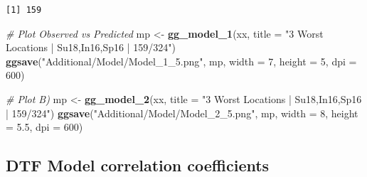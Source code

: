 \documentclass[
]{article}
\newenvironment{Shaded}{\begin{snugshade}}{\end{snugshade}}
\newcommand{\CommentTok}[1]{\textcolor[rgb]{0.56,0.35,0.01}{\textit{#1}}}
\newcommand{\DataTypeTok}[1]{\textcolor[rgb]{0.13,0.29,0.53}{#1}}
\newcommand{\DecValTok}[1]{\textcolor[rgb]{0.00,0.00,0.81}{#1}}
\newcommand{\FloatTok}[1]{\textcolor[rgb]{0.00,0.00,0.81}{#1}}
\newcommand{\KeywordTok}[1]{\textcolor[rgb]{0.13,0.29,0.53}{\textbf{#1}}}
\newcommand{\NormalTok}[1]{#1}
\newcommand{\OperatorTok}[1]{\textcolor[rgb]{0.81,0.36,0.00}{\textbf{#1}}}
\newcommand{\StringTok}[1]{\textcolor[rgb]{0.31,0.60,0.02}{#1}}
\begin{document}
\begin{Shaded}
\end{Shaded}

\begin{verbatim}
[1] 159
\end{verbatim}

\begin{Shaded}
\begin{Highlighting}[]
\CommentTok{# Plot Observed vs Predicted}
\NormalTok{mp <-}\StringTok{ }\KeywordTok{gg_model_1}\NormalTok{(xx, }\DataTypeTok{title =} \StringTok{"3 Worst Locations | Su18,In16,Sp16 | 159/324"}\NormalTok{)}
\KeywordTok{ggsave}\NormalTok{(}\StringTok{"Additional/Model/Model_1_5.png"}\NormalTok{, mp, }\DataTypeTok{width =} \DecValTok{7}\NormalTok{, }\DataTypeTok{height =} \DecValTok{5}\NormalTok{, }\DataTypeTok{dpi =} \DecValTok{600}\NormalTok{)}
\end{Highlighting}
\end{Shaded}

\begin{Shaded}
\begin{Highlighting}[]
\CommentTok{# Plot B)}
\NormalTok{mp <-}\StringTok{ }\KeywordTok{gg_model_2}\NormalTok{(xx, }\DataTypeTok{title =} \StringTok{"3 Worst Locations | Su18,In16,Sp16 | 159/324"}\NormalTok{)}
\KeywordTok{ggsave}\NormalTok{(}\StringTok{"Additional/Model/Model_2_5.png"}\NormalTok{, mp, }\DataTypeTok{width =} \DecValTok{8}\NormalTok{, }\DataTypeTok{height =} \FloatTok{5.5}\NormalTok{, }\DataTypeTok{dpi =} \DecValTok{600}\NormalTok{)}
\end{Highlighting}
\end{Shaded}

\hypertarget{dtf-model-correlation-coefficients}{%
\subsection{DTF Model correlation
coefficients}\label{dtf-model-correlation-coefficients}}
\end{document}
